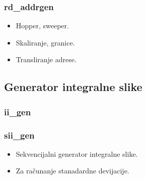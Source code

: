 \documentclass{beamer}
\begin{document}
\begin{frame}
  \frametitle<1->{rd\_addrgen}

  \begin{itemize}
  \item<1-> Hopper, sweeper.
  \item<1-> Skaliranje, granice.
  \item<1-> Transliranje adrese.

  \end{itemize}

  \begin{figure}[H]
    \centering
    \resizebox{0.8\textwidth}{!}{%
         
    }
  \end{figure}

\end{frame}


\subsection{Generator integralne slike}

\begin{frame}
  \frametitle<1-1>{ii\_gen}
  \frametitle<2-2>{sii\_gen}

  \begin{itemize}
  \item<1-1> Sekvencijalni generator integralne slike.
  \item<2-2> Za računanje stanadardne devijacije.

  \end{itemize}

  \begin{figure}[H]
  \end{figure}

\end{frame}
\end{document}
